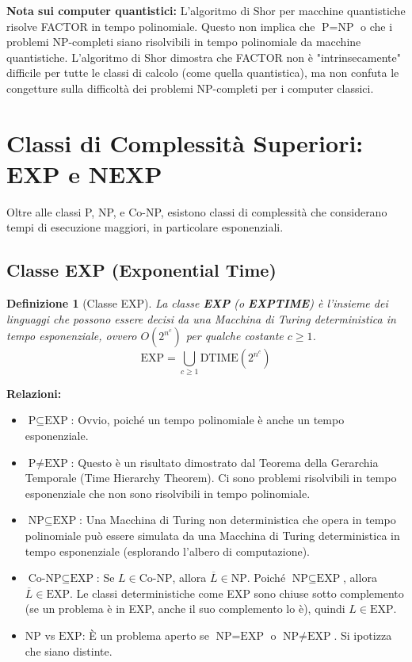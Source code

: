 \documentclass[a4paper, 11pt]{book} %
\newtheorem{definition}[theorem]{Definizione}
\theoremstyle{definition}
\begin{document}
\textbf{Nota sui computer quantistici:} L'algoritmo di Shor per macchine quantistiche risolve FACTOR in tempo polinomiale. Questo non implica che $\text{P} = \text{NP}$ o che i problemi NP-completi siano risolvibili in tempo polinomiale da macchine quantistiche. L'algoritmo di Shor dimostra che FACTOR non è "intrinsecamente" difficile per tutte le classi di calcolo (come quella quantistica), ma non confuta le congetture sulla difficoltà dei problemi NP-completi per i computer classici.

\section{Classi di Complessità Superiori: EXP e NEXP}

Oltre alle classi P, NP, e Co-NP, esistono classi di complessità che considerano tempi di esecuzione maggiori, in particolare esponenziali.

\subsection{Classe EXP (Exponential Time)}
\begin{definition}[Classe EXP]
La classe \textbf{EXP} (o \textbf{EXPTIME}) è l'insieme dei linguaggi che possono essere decisi da una Macchina di Turing deterministica in tempo esponenziale, ovvero $O(2^{n^c})$ per qualche costante $c \ge 1$.
\[
\text{EXP} = \bigcup_{c \ge 1} \text{DTIME}(2^{n^c})
\]
\end{definition}

\textbf{Relazioni:}
\begin{itemize}
    \item $\text{P} \subseteq \text{EXP}$: Ovvio, poiché un tempo polinomiale è anche un tempo esponenziale.
    \item $\text{P} \neq \text{EXP}$: Questo è un risultato dimostrato dal Teorema della Gerarchia Temporale (Time Hierarchy Theorem). Ci sono problemi risolvibili in tempo esponenziale che non sono risolvibili in tempo polinomiale.
    \item $\text{NP} \subseteq \text{EXP}$: Una Macchina di Turing non deterministica che opera in tempo polinomiale può essere simulata da una Macchina di Turing deterministica in tempo esponenziale (esplorando l'albero di computazione).
    \item $\text{Co-NP} \subseteq \text{EXP}$: Se $L \in \text{Co-NP}$, allora $\overline{L} \in \text{NP}$. Poiché $\text{NP} \subseteq \text{EXP}$, allora $\overline{L} \in \text{EXP}$. Le classi deterministiche come EXP sono chiuse sotto complemento (se un problema è in EXP, anche il suo complemento lo è), quindi $L \in \text{EXP}$.
    \item $\text{NP}$ vs $\text{EXP}$: È un problema aperto se $\text{NP} = \text{EXP}$ o $\text{NP} \neq \text{EXP}$. Si ipotizza che siano distinte.
\end{itemize}
\end{document}

